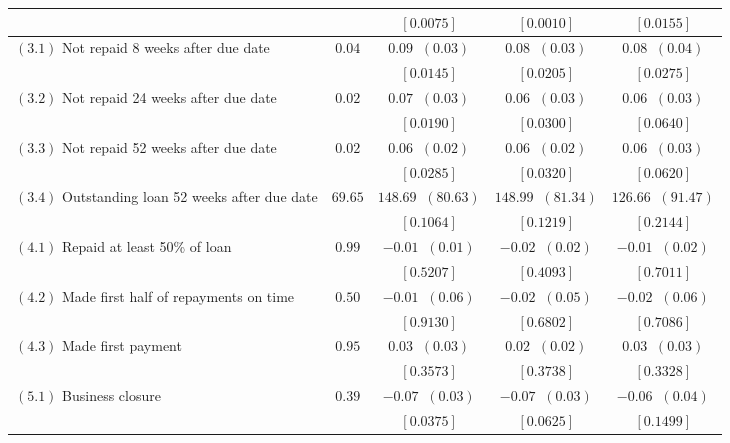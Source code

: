 \begin{table}[!ht]
\begin{center}
\begin{tabular}{l|c@{\hskip 10pt}|c@{\hskip 10pt}|c@{\hskip 10pt}|c}
  &  & $ [ \mathbf { 0.0075 } ] $ & $ [ \mathbf { 0.0010 } ] $ & $ [ \mathbf { 0.0155 } ] $ \\ \hline 
\hline
 $ (3.1) $ Not repaid 8 weeks after due date & $  0.04 $ & $  0.09  \;\; (  0.03 ) $  & $  0.08  \;\; (  0.03 ) $  & $  0.08  \;\; (  0.04 ) $  \\ [-1mm] 
  &  & $ [ \mathbf { 0.0145 } ] $ & $ [ \mathbf { 0.0205 } ] $ & $ [ \mathbf { 0.0275 } ] $ \\ \hline 
 $ (3.2) $ Not repaid 24 weeks after due date & $  0.02 $ & $  0.07  \;\; (  0.03 ) $  & $  0.06  \;\; (  0.03 ) $  & $  0.06  \;\; (  0.03 ) $  \\ [-1mm] 
  &  & $ [ \mathbf { 0.0190 } ] $ & $ [ \mathbf { 0.0300 } ] $ & $ [ \mathbf { 0.0640 } ] $ \\ \hline 
 $ (3.3) $ Not repaid 52 weeks after due date & $  0.02 $ & $  0.06  \;\; (  0.02 ) $  & $  0.06  \;\; (  0.02 ) $  & $  0.06  \;\; (  0.03 ) $  \\ [-1mm] 
  &  & $ [ \mathbf { 0.0285 } ] $ & $ [ \mathbf { 0.0320 } ] $ & $ [ \mathbf { 0.0620 } ] $ \\ \hline 
 $ (3.4) $ Outstanding loan 52 weeks after due date & $ 69.65 $ & $ 148.69  \;\; ( 80.63 ) $  & $ 148.99  \;\; ( 81.34 ) $  & $ 126.66  \;\; ( 91.47 ) $  \\ [-1mm] 
  &  & $ [  0.1064  ] $ & $ [  0.1219  ] $ & $ [  0.2144  ] $ \\ \hline 
\hline
 $ (4.1) $ Repaid at least 50\% of loan & $  0.99 $ & $ -0.01  \;\; (  0.01 ) $  & $ -0.02  \;\; (  0.02 ) $  & $ -0.01  \;\; (  0.02 ) $  \\ [-1mm] 
  &  & $ [  0.5207  ] $ & $ [  0.4093  ] $ & $ [  0.7011  ] $ \\ \hline 
 $ (4.2) $ Made first half of repayments on time & $  0.50 $ & $ -0.01  \;\; (  0.06 ) $  & $ -0.02  \;\; (  0.05 ) $  & $ -0.02  \;\; (  0.06 ) $  \\ [-1mm] 
  &  & $ [  0.9130  ] $ & $ [  0.6802  ] $ & $ [  0.7086  ] $ \\ \hline 
 $ (4.3) $ Made first payment & $  0.95 $ & $  0.03  \;\; (  0.03 ) $  & $  0.02  \;\; (  0.02 ) $  & $  0.03  \;\; (  0.03 ) $  \\ [-1mm] 
  &  & $ [  0.3573  ] $ & $ [  0.3738  ] $ & $ [  0.3328  ] $ \\ \hline 
\hline
 $ (5.1) $ Business closure & $  0.39 $ & $ -0.07  \;\; (  0.03 ) $  & $ -0.07  \;\; (  0.03 ) $  & $ -0.06  \;\; (  0.04 ) $  \\ [-1mm] 
  &  & $ [ \mathbf { 0.0375 } ] $ & $ [ \mathbf { 0.0625 } ] $ & $ [  0.1499  ] $ \\ \hline 

\end{tabular}
\end{center}
\end{table}
